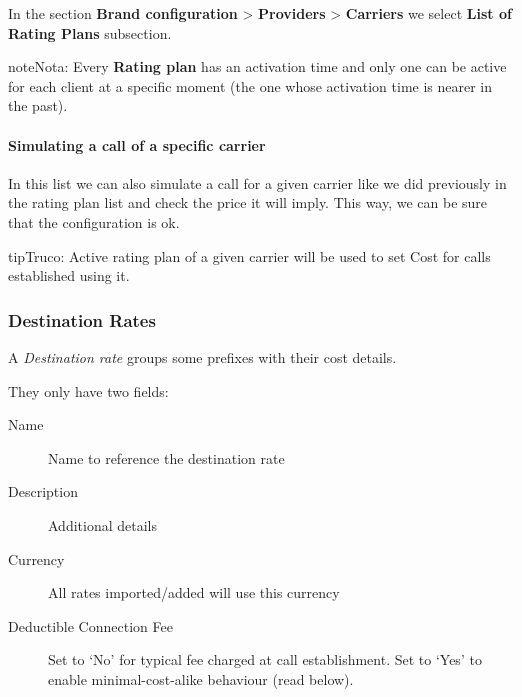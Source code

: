 \documentclass[letterpaper,10pt,spanish]{sphinxmanual}
\begin{document}
In the section \textbf{Brand configuration} \textgreater{} \textbf{Providers} \textgreater{} \textbf{Carriers} we select \textbf{List of Rating Plans} subsection.

\begin{notice}{note}{Nota:}
Every \textbf{Rating plan} has an activation time and only one can be active for each
client at a specific moment (the one whose activation time is nearer in the past).
\end{notice}
\paragraph{Simulating a call of a specific carrier}

In this list we can also simulate a call for a given carrier like we did previously
in the rating plan list and check the price it will imply. This way, we can be sure
that the configuration is ok.

\begin{notice}{tip}{Truco:}
Active rating plan of a given carrier will be used to set Cost for calls established using it.
\end{notice}


\subsubsection{Destination Rates}
\label{administration_portal/brand/billing/destination_rates:destination-rates}\label{administration_portal/brand/billing/destination_rates::doc}\label{administration_portal/brand/billing/destination_rates:destination-rate}
A \emph{Destination rate} groups some prefixes with their cost details.

They only have two fields:
\begin{description}
\item[{Name}] \leavevmode{}\label{administration_portal/brand/billing/destination_rates:term-name}
Name to reference the destination rate

\item[{Description}] \leavevmode{}\label{administration_portal/brand/billing/destination_rates:term-description}
Additional details

\item[{Currency}] \leavevmode{}\label{administration_portal/brand/billing/destination_rates:term-currency}
All rates imported/added will use this currency

\item[{Deductible Connection Fee}] \leavevmode{}\label{administration_portal/brand/billing/destination_rates:term-deductible-connection-fee}
Set to `No' for typical fee charged at call establishment. Set to `Yes' to enable
minimal-cost-alike behaviour (read below).

\end{description}
\end{document}
